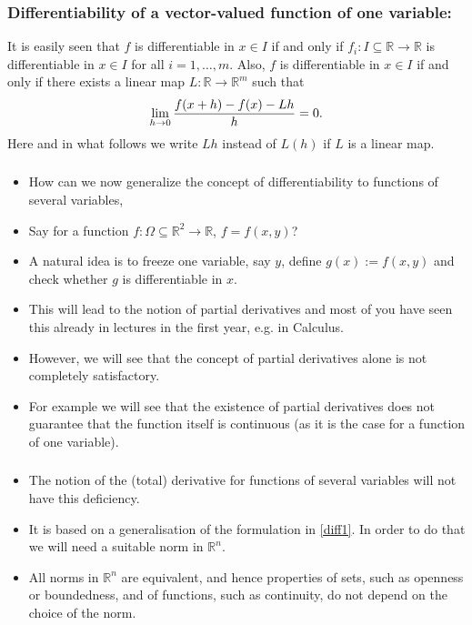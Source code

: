  \begin{frame}[fragile] \frametitle{ Differentiability of a vector-valued function of one variable:}

   It is easily seen that $f$ is differentiable in $x \in I$ if and only if 
  $f_i \colon I \subseteq \mathbb{R} \rightarrow \mathbb{R}$
  is differentiable in  $x \in I$ for all  $i = 1, \ldots, m$. Also, 
  $f$ is differentiable in  $x \in I$  if and only if there exists a linear map
  $L\colon \mathbb{R} \rightarrow \mathbb{R}^m$ 
  such that \[\lim_{h \rightarrow 0} {f(x+h) - f(x) -Lh \over h} = 0.\]
  Here and in what follows we write $Lh$ instead of $L(h)$ if $L$ is a linear map.
\end{frame}


 \begin{frame}[fragile] \frametitle{}
 
 \begin{itemize}
\item How can we now generalize the concept of differentiability to functions of several variables,
\item Say for a function $f\colon \Omega \subseteq \mathbb{R}^2 \to \mathbb{R}$, $f=f(x,y)$?
\item A natural idea is to freeze one variable, say $y$, define $g(x):=f(x,y)$ and check whether
$g$ is differentiable in $x$. 
\item  This will lead to the notion of partial derivatives and most
of you have seen this already in lectures in the first year, e.g. in Calculus.
\item  However, we will see that the concept of partial derivatives alone is not completely
satisfactory.
\item For example we will see that the existence of partial derivatives does not
guarantee that the function itself is continuous (as it is the case for a function of one variable).

\end{itemize}


\end{frame}

 \begin{frame}[fragile] \frametitle{}
 \begin{itemize}
\item  The notion of the (total) derivative for functions of several
variables will not have this deficiency. 
\item  It is based on 
a generalisation of the formulation in \eqref{diff1}.
In order to do that we will need a suitable norm in $\mathbb{R}^n$. 
\item  All
norms in $\mathbb{R}^n$ are equivalent, and hence 
properties of sets, such as openness or boundedness, and of functions,
such as continuity, do not depend on the choice of the norm.
\end{itemize}
\end{frame}

